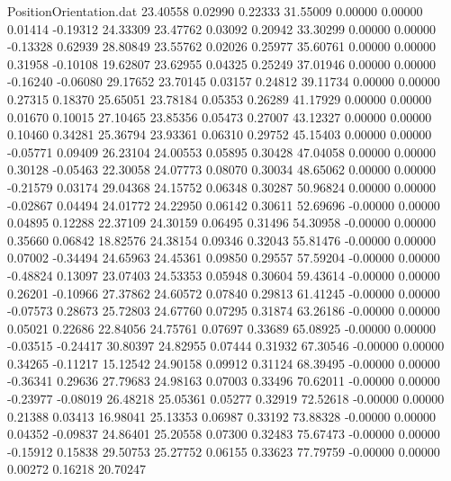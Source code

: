 \begin{filecontents}{PositionOrientation.dat}
  23.40558    0.02990    0.22333    31.55009    0.00000    0.00000    0.01414   -0.19312   24.33309
  23.47762    0.03092    0.20942    33.30299    0.00000    0.00000   -0.13328    0.62939   28.80849
  23.55762    0.02026    0.25977    35.60761    0.00000    0.00000    0.31958   -0.10108   19.62807
  23.62955    0.04325    0.25249    37.01946    0.00000    0.00000   -0.16240   -0.06080   29.17652
  23.70145    0.03157    0.24812    39.11734    0.00000    0.00000    0.27315    0.18370   25.65051
  23.78184    0.05353    0.26289    41.17929    0.00000    0.00000    0.01670    0.10015   27.10465
  23.85356    0.05473    0.27007    43.12327    0.00000    0.00000    0.10460    0.34281   25.36794
  23.93361    0.06310    0.29752    45.15403    0.00000    0.00000   -0.05771    0.09409   26.23104
  24.00553    0.05895    0.30428    47.04058    0.00000    0.00000    0.30128   -0.05463   22.30058
  24.07773    0.08070    0.30034    48.65062    0.00000    0.00000   -0.21579    0.03174   29.04368
  24.15752    0.06348    0.30287    50.96824    0.00000    0.00000   -0.02867    0.04494   24.01772
  24.22950    0.06142    0.30611    52.69696   -0.00000    0.00000    0.04895    0.12288   22.37109
  24.30159    0.06495    0.31496    54.30958   -0.00000    0.00000    0.35660    0.06842   18.82576
  24.38154    0.09346    0.32043    55.81476   -0.00000    0.00000    0.07002   -0.34494   24.65963
  24.45361    0.09850    0.29557    57.59204   -0.00000    0.00000   -0.48824    0.13097   23.07403
  24.53353    0.05948    0.30604    59.43614   -0.00000    0.00000    0.26201   -0.10966   27.37862
  24.60572    0.07840    0.29813    61.41245   -0.00000    0.00000   -0.07573    0.28673   25.72803
  24.67760    0.07295    0.31874    63.26186   -0.00000    0.00000    0.05021    0.22686   22.84056
  24.75761    0.07697    0.33689    65.08925   -0.00000    0.00000   -0.03515   -0.24417   30.80397
  24.82955    0.07444    0.31932    67.30546   -0.00000    0.00000    0.34265   -0.11217   15.12542
  24.90158    0.09912    0.31124    68.39495   -0.00000    0.00000   -0.36341    0.29636   27.79683
  24.98163    0.07003    0.33496    70.62011   -0.00000    0.00000   -0.23977   -0.08019   26.48218
  25.05361    0.05277    0.32919    72.52618   -0.00000    0.00000    0.21388    0.03413   16.98041
  25.13353    0.06987    0.33192    73.88328   -0.00000    0.00000    0.04352   -0.09837   24.86401
  25.20558    0.07300    0.32483    75.67473   -0.00000    0.00000   -0.15912    0.15838   29.50753
  25.27752    0.06155    0.33623    77.79759   -0.00000    0.00000    0.00272    0.16218   20.70247

\end{filecontents}
